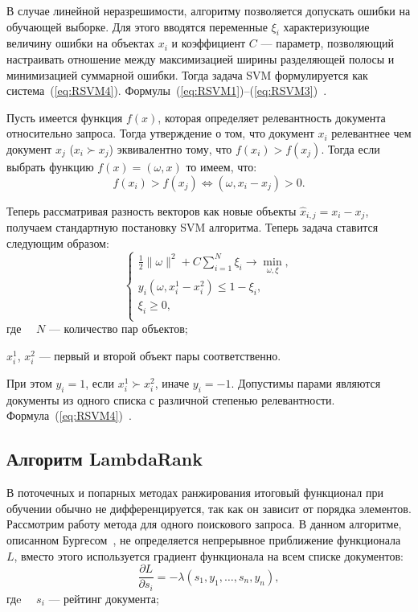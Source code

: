 В случае линейной неразрешимости, алгоритму позволяется допускать ошибки на обучающей выборке. Для этого вводятся переменные $\xi_{i}$ характеризующие величину ошибки на объектах $x_i$ и коэффициент $C$ --- параметр, позволяющий настраивать отношение между максимизацией ширины разделяющей полосы и минимизацией суммарной ошибки. Тогда задача SVM формулируется как система~(\ref{eq:RSVM4}). Формулы~(\ref{eq:RSVM1})--(\ref{eq:RSVM3})~\cite{ML_no_wors}.

Пусть имеется функция $f(x)$, которая определяет релевантность документа относительно запроса. Тогда утверждение о том, что документ $x_{i}$ релевантнее чем документ $x_{j}$  ($x_{i} \succ x_{j}$)  эквивалентно тому, что $f(x_{i}) > f(x_{j})$. Тогда если выбрать функцию $f(x)=(\omega, x)$ то имеем, что:
\[
	f(x_{i}) > f(x_{j}) \iff (\omega, x_{i} - x_{j}) > 0.
\]

Теперь рассматривая разность векторов как новые объекты $\hat{x}_{i, j} = x_{i} - x_{j}$, получаем стандартную постановку SVM алгоритма. Теперь задача ставится следующим образом:
\begin{equation}
\begin{cases}
	\label{eq:RSVM4}
	\frac{1}{2}\| \omega \|^2+C  \displaystyle\sum_{i=1}^{N} \xi_{i}\to \min_{\omega, \xi}, \\
	y_{i}(\omega, x_{i}^1 - x_{i}^2) \leq 1 - \xi_{i}, \\
	\xi_{i} \geq 0, \\
\end{cases}
\end{equation}
где ~~$N$ --- количество пар объектов;

$x_{i}^1$, $x_{i}^2$ --- первый и второй объект пары соответственно. 

При этом $y_{i} = 1$, если $x_{i}^1 \succ x_{i}^2$, иначе  $y_{i} = -1$. Допустимы парами являются документы из одного списка  с различной степенью релевантности. Формула~(\ref{eq:RSVM4})~\cite{RankSVM}.

\subsection{Алгоритм LambdaRank}

В поточечных и попарных методах ранжирования итоговый функционал при обучении обычно не дифференцируется, так как он зависит от порядка элементов. Рассмотрим работу метода для одного поискового запроса. В данном алгоритме, описанном Бургесом~\cite{LamdaRank}, не определяется непрерывное приближение функционала $L$, вместо этого используется градиент функционала на всем списке документов:
\begin{equation}
	\label{eq:LBR1}
	\frac{\partial L}{\partial s_{i}} = -\lambda(s_{1}, y_{1}, \dots, s_{n}, y_{n}),
\end{equation}
гдe ~~$s_{i}$ --- рейтинг документа;

